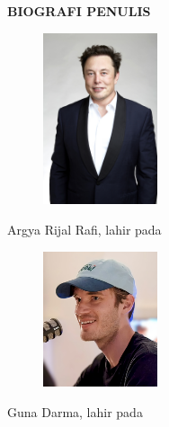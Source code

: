 \begin{center}
  \Large\textbf{BIOGRAFI PENULIS}
\end{center}
\vspace{2ex}


\begin{figure}
  \centering
  \vspace{-3ex}
  \includegraphics[width=0.3\textwidth]{gambar/elon.jpg}
  \vspace{-4ex}
\end{figure}

\noindent Argya Rijal Rafi, lahir pada \lipsum[1]

\vspace{2ex}

\begin{figure}
  \centering
  \vspace{-3ex}
  \includegraphics[width=0.3\textwidth]{gambar/felix.jpg}
  \vspace{-4ex}
\end{figure}

\noindent Guna Darma, lahir pada \lipsum[2]
